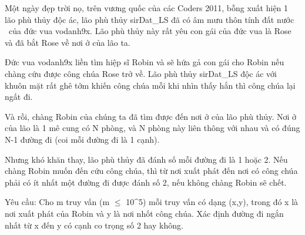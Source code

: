 Một ngày đẹp trời nọ, trên vương quốc của các Coders 2011, bỗng xuất hiện 1 lão phù thủy độc ác, lão phù thủy sirDat\_LS đã có âm mưu thôn tính đất nước  của đức vua vodanh9x. Lão phù thủy này rất yêu con gái của đức vua là Rose và đã bắt Rose về nơi ở của lão ta.

Đức vua vodanh9x liền tìm hiệp sĩ Robin và sẽ hứa gả con gái cho Robin nếu chàng cứu được công chúa Rose trở về. Lão phù thủy sirDat\_LS độc ác với khuôn mặt rất ghê tởm khiến công chúa mỗi khi nhìn thấy hắn thì công chúa lại ngất đi.

Và rồi, chàng Robin của chúng ta đã tìm được đến nơi ở của lão phù thủy. Nơi ở của lão là 1 mê cung có N phòng, và N phòng này liên thông với nhau và có đúng N-1 đường đi (coi mỗi đường đi là 1 cạnh).

Nhưng khó khăn thay, lão phù thủy đã đánh số mỗi đường đi là 1 hoặc 2. Nếu chàng Robin muốn đến cứu công chúa, thì từ nơi xuất phát đến nơi có công chúa phải có ít nhất một đường đi được đánh số 2, nếu không chàng Robin sẽ chết.

Yêu cầu: Cho m truy vấn (m  $\le$  10^5) mỗi truy vấn có dạng (x,y), trong đó x là nơi xuất phát của Robin và y là nơi nhốt công chúa. Xác định đường đi ngắn nhất từ x đến y có cạnh co trọng số 2 hay không.

\